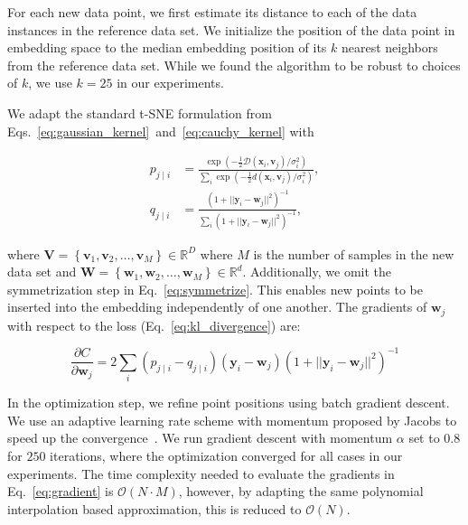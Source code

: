 \documentclass[runningheads]{llncs}
\begin{document}
For each new data point, we first estimate its distance to each of the data instances in the reference data set. We initialize the position of the data point in embedding space to the median embedding position of its $k$ nearest neighbors from the reference data set. While we found the algorithm to be robust to choices of $k$, we use $k=25$ in our experiments.

We adapt the standard t-SNE formulation from Eqs.~\ref{eq:gaussian_kernel}~and~\ref{eq:cauchy_kernel} with

\begin{align}
p_{j \mid i} &= \frac{\exp \left ( -\frac{1}{2} \mathcal{D}(\mathbf{x}_i, \mathbf{v}_j) / \sigma_i^2 \right )}{\sum_{i} \exp \left ( -\frac{1}{2} d(\mathbf{x}_i, \mathbf{v}_j) / \sigma_i^2 \right )}, \\
q_{j \mid i} &= \frac{\left ( 1 + || \mathbf{y}_i - \mathbf{w}_j ||^2 \right )^{-1}}{\sum_{i}\left ( 1 + || \mathbf{y}_i - \mathbf{w}_j ||^2 \right )^{-1}},
\end{align}

\noindent where $\mathbf{V} = \left \{ \mathbf{v}_1, \mathbf{v}_2, \dots, \mathbf{v}_M \right \} \in \mathbb{R}^D$ where $M$ is the number of samples in the new data set and $\mathbf{W} = \left \{ \mathbf{w}_1, \mathbf{w}_2, \dots, \mathbf{w}_M \right \} \in \mathbb{R}^d$. Additionally, we omit the symmetrization step in Eq.~\ref{eq:symmetrize}. This enables new points to be inserted into the embedding independently of one another. The gradients of $\mathbf{w}_j$ with respect to the loss (Eq.~\ref{eq:kl_divergence}) are:

\begin{equation}
\frac{\partial C}{\partial \mathbf{w}_j} = 2 \sum_i \left ( p_{j \mid i} - q_{j \mid i} \right ) \left ( \mathbf{y}_i - \mathbf{w}_j \right ) \left ( 1 + || \mathbf{y}_i - \mathbf{w}_j || ^2 \right )^{-1}
\label{eq:gradient}
\end{equation}

In the optimization step, we refine point positions using batch gradient descent. We use an adaptive learning rate scheme with momentum proposed by Jacobs to speed up the convergence~\cite{momentum}. We run gradient descent with momentum $\alpha$ set to $0.8$ for $250$ iterations, where the optimization converged for all cases in our experiments.  The time complexity needed to evaluate the gradients in Eq.~\ref{eq:gradient} is $\mathcal{O}(N \cdot M)$, however, by adapting the same polynomial interpolation based approximation, this is reduced to $\mathcal{O}(N)$.
\end{document}
